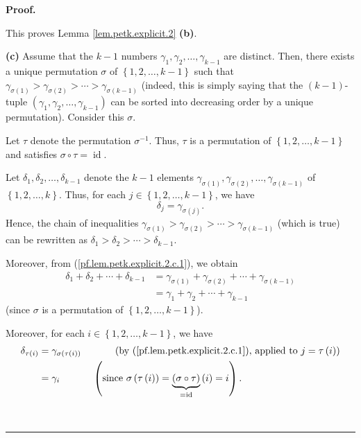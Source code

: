 \documentclass[numbers=enddot,12pt,final,onecolumn,notitlepage]{scrartcl}%
\theoremstyle{definition}
\newenvironment{proof}[1][Proof]{\noindent\textbf{#1.} }{\ \rule{0.5em}{0.5em}}
\newenvironment{verlong}{}{}
\begin{document}
\begin{proof}
\begin{verlong}
\end{verlong}

\noindent This proves Lemma \ref{lem.petk.explicit.2} \textbf{(b)}.

\textbf{(c)} Assume that the $k-1$ numbers $\gamma_{1},\gamma_{2}%
,\ldots,\gamma_{k-1}$ are distinct. Then, there exists a unique permutation
$\sigma$ of $\left\{  1,2,\ldots,k-1\right\}  $ such that $\gamma
_{\sigma\left(  1\right)  }>\gamma_{\sigma\left(  2\right)  }>\cdots
>\gamma_{\sigma\left(  k-1\right)  }$ (indeed, this is simply saying that the
$\left(  k-1\right)  $-tuple $\left(  \gamma_{1},\gamma_{2},\ldots
,\gamma_{k-1}\right)  $ can be sorted into decreasing order by a unique
permutation). Consider this $\sigma$.

Let $\tau$ denote the permutation $\sigma^{-1}$. Thus, $\tau$ is a permutation
of $\left\{  1,2,\ldots,k-1\right\}  $ and satisfies $\sigma\circ
\tau=\operatorname*{id}$.

Let $\delta_{1},\delta_{2},\ldots,\delta_{k-1}$ denote the $k-1$ elements
$\gamma_{\sigma\left(  1\right)  },\gamma_{\sigma\left(  2\right)  }%
,\ldots,\gamma_{\sigma\left(  k-1\right)  }$ of $\left\{  1,2,\ldots
,k\right\}  $. Thus, for each $j\in\left\{  1,2,\ldots,k-1\right\}  $, we have%
\begin{equation}
\delta_{j}=\gamma_{\sigma\left(  j\right)  }.
\label{pf.lem.petk.explicit.2.c.1}%
\end{equation}
Hence, the chain of inequalities $\gamma_{\sigma\left(  1\right)  }%
>\gamma_{\sigma\left(  2\right)  }>\cdots>\gamma_{\sigma\left(  k-1\right)  }$
(which is true) can be rewritten as $\delta_{1}>\delta_{2}>\cdots>\delta
_{k-1}$.

Moreover, from (\ref{pf.lem.petk.explicit.2.c.1}), we obtain%
\begin{align}
\delta_{1}+\delta_{2}+\cdots+\delta_{k-1}  &  =\gamma_{\sigma\left(  1\right)
}+\gamma_{\sigma\left(  2\right)  }+\cdots+\gamma_{\sigma\left(  k-1\right)
}\nonumber\\
&  =\gamma_{1}+\gamma_{2}+\cdots+\gamma_{k-1}
\label{pf.lem.petk.explicit.2.c.sumdel=sumgam}%
\end{align}
(since $\sigma$ is a permutation of $\left\{  1,2,\ldots,k-1\right\}  $).

Moreover, for each $i\in\left\{  1,2,\ldots,k-1\right\}  $, we have%
\begin{align}
\delta_{\tau\left(  i\right)  }  &  =\gamma_{\sigma\left(  \tau\left(
i\right)  \right)  }\ \ \ \ \ \ \ \ \ \ \left(  \text{by
(\ref{pf.lem.petk.explicit.2.c.1}), applied to }j=\tau\left(  i\right)
\right) \nonumber\\
&  =\gamma_{i}\ \ \ \ \ \ \ \ \ \ \left(  \text{since }\sigma\left(
\tau\left(  i\right)  \right)  =\underbrace{\left(  \sigma\circ\tau\right)
}_{=\operatorname*{id}}\left(  i\right)  =i\right)  .
\label{pf.lem.petk.explicit.2.c.2}%
\end{align}



\end{proof}
\end{document}
